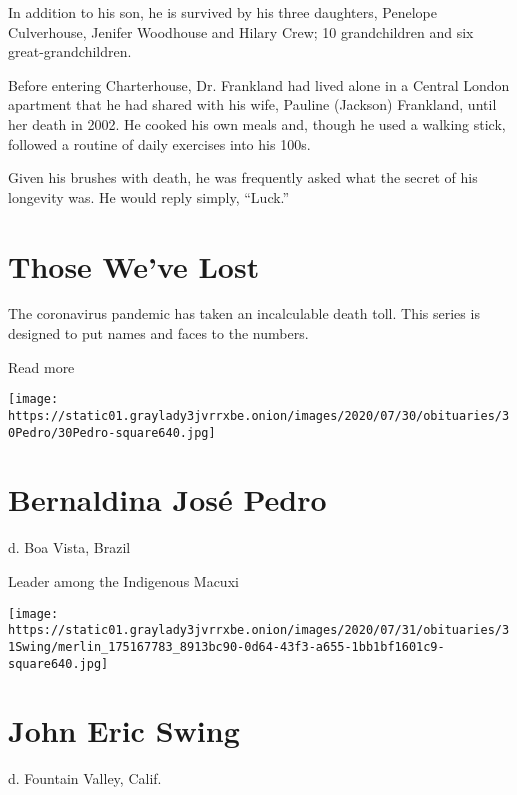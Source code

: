In addition to his son, he is survived by his three daughters, Penelope
Culverhouse, Jenifer Woodhouse and Hilary Crew; 10 grandchildren and six
great-grandchildren.

Before entering Charterhouse, Dr. Frankland had lived alone in a Central
London apartment that he had shared with his wife, Pauline (Jackson)
Frankland, until her death in 2002. He cooked his own meals and, though
he used a walking stick, followed a routine of daily exercises into his
100s.

Given his brushes with death, he was frequently asked what the secret of
his longevity was. He would reply simply, ``Luck.''

\href{https://www.nytimes3xbfgragh.onion/interactive/2020/obituaries/people-died-coronavirus-obituaries.html?action=click\&pgtype=Article\&state=default\&region=BELOW_MAIN_CONTENT\&context=covid_obits_promo}{}

\hypertarget{those-weve-lost}{%
\section{Those We've Lost}\label{those-weve-lost}}

The coronavirus pandemic has taken an incalculable death toll. This
series is designed to put names and faces to the numbers.

Read more

\texttt{[image: https://static01.graylady3jvrrxbe.onion/images/2020/07/30/obituaries/30Pedro/30Pedro-square640.jpg]}

\hypertarget{bernaldina-josuxe9-pedro}{%
\section{Bernaldina José Pedro}\label{bernaldina-josuxe9-pedro}}

d. Boa Vista, Brazil

Leader among the Indigenous Macuxi

\texttt{[image: https://static01.graylady3jvrrxbe.onion/images/2020/07/31/obituaries/31Swing/merlin\_175167783\_8913bc90-0d64-43f3-a655-1bb1bf1601c9-square640.jpg]}

\hypertarget{john-eric-swing}{%
\section{John Eric Swing}\label{john-eric-swing}}

d. Fountain Valley, Calif.

